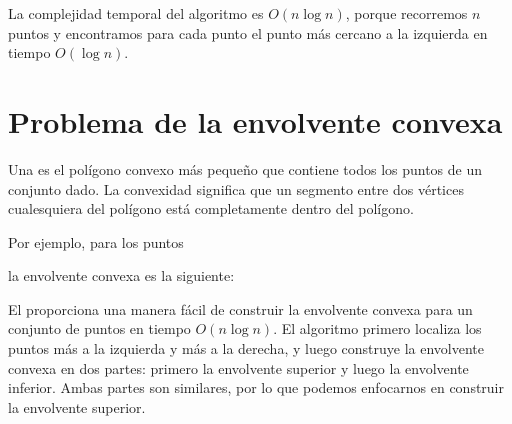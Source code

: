 La complejidad temporal del algoritmo es $O(n \log n)$,
porque recorremos $n$ puntos y
encontramos para cada punto el punto más cercano a la izquierda
en tiempo $O(\log n)$.

\section{Problema de la envolvente convexa}

Una  es el polígono convexo más pequeño
que contiene todos los puntos de un conjunto dado.
La convexidad significa que un segmento entre
dos vértices cualesquiera del polígono está completamente
dentro del polígono.

\begin{samepage}
Por ejemplo, para los puntos
\begin{center}
\end{center}
\end{samepage}
la envolvente convexa es la siguiente:
\begin{center}
\end{center}


El  \cite{and79} proporciona
una manera fácil de
construir la envolvente convexa para un conjunto de puntos
en tiempo $O(n \log n)$.
El algoritmo primero localiza los puntos más a la izquierda
y más a la derecha, y luego
construye la envolvente convexa en dos partes:
primero la envolvente superior y luego la envolvente inferior.
Ambas partes son similares, por lo que podemos enfocarnos en
construir la envolvente superior.


